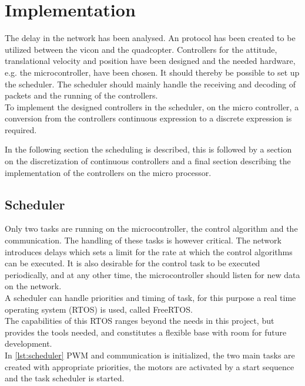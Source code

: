 \chapter{Implementation}
The delay in the network has been analysed. An protocol has been created to be utilized between the vicon and the quadcopter. Controllers for the attitude, translational velocity and position have been designed and the needed hardware, e.g. the microcontroller, have been chosen. It should thereby be possible to set up the scheduler. The scheduler should mainly handle the receiving and decoding of packets and the running of the controllers. \\ To implement the designed controllers in the scheduler, on the micro controller, a conversion from the controllers continuous expression to a discrete expression is required.

In the following section the scheduling is described, this is followed by a section on the discretization of continuous controllers and a final section describing the implementation of the controllers on the micro processor.

\section{Scheduler}
Only two tasks are running on the microcontroller, the control algorithm and the communication. The handling of these tasks is however critical. The network introduces delays which sets a limit for the rate at which the control algorithms can be executed. It is also desirable for the control task to be executed periodically, and at any other time, the microcontroller should listen for new data on the network.\\
A scheduler can handle priorities and timing of task, for this purpose a real time operating system (RTOS) is used, called FreeRTOS.\\
The capabilities of this RTOS ranges beyond the needs in this project, but provides the tools needed, and constitutes a flexible base with room for future development.\\
In \autoref{lst:scheduler} PWM and communication is initialized, the two main tasks are created with appropriate priorities, the motors are activated by a start sequence and the task scheduler is started.

